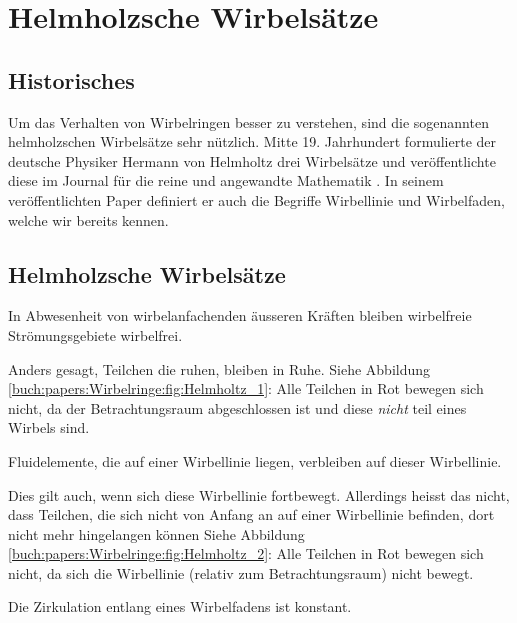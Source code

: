%
%
%
\section{Helmholzsche Wirbelsätze}

\subsection{Historisches}

Um das Verhalten von Wirbelringen besser zu verstehen, sind die sogenannten helmholzschen Wirbelsätze sehr nützlich. 
Mitte 19. Jahrhundert formulierte der deutsche Physiker Hermann von Helmholtz drei Wirbelsätze und veröffentlichte diese im Journal für die reine und angewandte Mathematik \cite{Wirbelringe:JournalHelmholz}.
In seinem veröffentlichten Paper definiert er auch die Begriffe Wirbellinie und Wirbelfaden, welche wir bereits kennen.

\subsection{Helmholzsche Wirbelsätze}

\begin{satz}
    In Abwesenheit von wirbelanfachenden äusseren Kräften bleiben wirbelfreie Strömungsgebiete wirbelfrei.
\end{satz}

Anders gesagt, Teilchen die ruhen, bleiben in Ruhe. 
Siehe Abbildung \ref{buch:papers:Wirbelringe:fig:Helmholtz_1}: 
Alle Teilchen in Rot bewegen sich nicht, da der Betrachtungsraum abgeschlossen ist und diese {\em nicht} teil eines Wirbels sind.

\begin{satz}
    Fluidelemente, die auf einer Wirbellinie liegen, verbleiben auf dieser Wirbellinie.
\end{satz}

Dies gilt auch, wenn sich diese Wirbellinie fortbewegt. 
Allerdings heisst das nicht, dass Teilchen, die sich nicht von Anfang an auf einer Wirbellinie befinden, dort nicht mehr hingelangen können
Siehe Abbildung \ref{buch:papers:Wirbelringe:fig:Helmholtz_2}:  
Alle Teilchen in Rot bewegen sich nicht, da sich die Wirbellinie (relativ zum Betrachtungsraum) nicht bewegt.

\begin{satz}
    Die Zirkulation entlang eines Wirbelfadens ist konstant. 
\end{satz}

